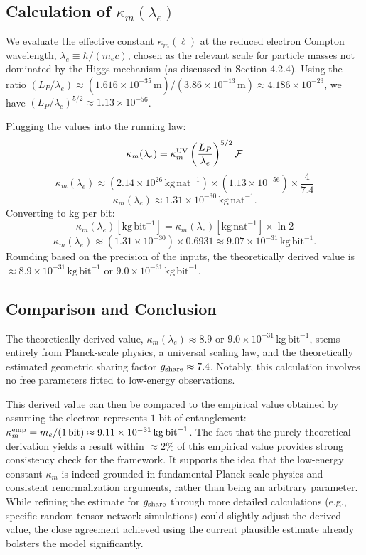 \documentclass[11pt]{article}
\begin{document}
\subsection*{Calculation of $\kappa_m(\lambda_e)$} %

We evaluate the effective constant $\kappa_m(\ell)$ at the reduced electron Compton wavelength, $\lambda_e \equiv \hbar/(m_e c)$, chosen as the relevant scale for particle masses not dominated by the Higgs mechanism (as discussed in Section 4.2.4). Using the ratio $(L_P / \lambda_e) \approx (1.616 \times 10^{-35}\,\mathrm{m}) / (3.86 \times 10^{-13}\,\mathrm{m}) \approx 4.186 \times 10^{-23}$, we have $(L_P / \lambda_e)^{5/2} \approx 1.13 \times 10^{-56}$.

Plugging the values into the running law:
$$ \kappa_m(\lambda_e) = \kappa_m^{\rm UV} \left(\frac{L_P}{\lambda_e}\right)^{5/2} \mathcal{F} $$
$$ \kappa_m(\lambda_e) \approx (2.14 \times 10^{26}\,\mathrm{kg\,nat}^{-1}) \times (1.13 \times 10^{-56}) \times \frac{4}{7.4} $$
$$ \kappa_m(\lambda_e) \approx 1.31 \times 10^{-30}\,\mathrm{kg\,nat}^{-1}. $$
Converting to kg per bit:
$$ \kappa_m(\lambda_e) [\mathrm{kg\,bit}^{-1}] = \kappa_m(\lambda_e) [\mathrm{kg\,nat}^{-1}] \times \ln 2 $$
$$ \kappa_m(\lambda_e) \approx (1.31 \times 10^{-30}) \times 0.6931 \approx 9.07 \times 10^{-31}\,\mathrm{kg\,bit}^{-1}. $$
Rounding based on the precision of the inputs, the theoretically derived value is $\approx 8.9 \times 10^{-31}\,\mathrm{kg\,bit}^{-1}$ or $9.0 \times 10^{-31}\,\mathrm{kg\,bit}^{-1}$.

\subsection*{Comparison and Conclusion} %

The theoretically derived value, $\kappa_m(\lambda_e) \approx 8.9 \text{ or } 9.0 \times 10^{-31}\,\mathrm{kg\,bit}^{-1}$, stems entirely from Planck-scale physics, a universal scaling law, and the theoretically estimated geometric sharing factor $g_{\rm share} \approx 7.4$. Notably, this calculation involves no free parameters fitted to low-energy observations.

This derived value can then be compared to the empirical value obtained by assuming the electron represents $1$ bit of entanglement: $\kappa_m^{\rm emp} = m_e / (1\,\mathrm{bit}) \approx 9.11 \times 10^{-31}\,\mathrm{kg\,bit}^{-1}$. The fact that the purely theoretical derivation yields a result within $\approx 2\%$ of this empirical value provides strong consistency check for the framework. It supports the idea that the low-energy constant $\kappa_m$ is indeed grounded in fundamental Planck-scale physics and consistent renormalization arguments, rather than being an arbitrary parameter. While refining the estimate for $g_{\rm share}$ through more detailed calculations (e.g., specific random tensor network simulations) could slightly adjust the derived value, the close agreement achieved using the current plausible estimate already bolsters the model significantly.
\end{document}
